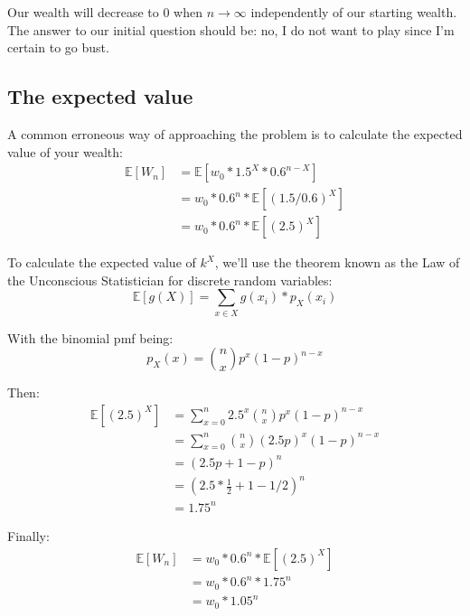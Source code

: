 \documentclass[12pt]{article}
\begin{document}
  
Our wealth will decrease to 0 when $n\to\infty$ independently of our starting wealth. The answer to our initial question should be: no, I do not want to play since I'm certain to go bust.

\subsection{The expected value}
A common erroneous way of approaching the problem is to calculate the expected value of your wealth:
\begin{equation*}
  \begin{split}
    \mathbb{E}[W_n] &= \mathbb{E}[w_0 * 1.5^X * 0.6^{n-X}]\\
    & = w_0 * 0.6^n * \mathbb{E}[(1.5/0.6)^X]\\
    & = w_0 * 0.6^n * \mathbb{E}[(2.5)^X]
  \end{split}
\end{equation*}

To calculate the expected value of $k^X$, we'll use the theorem known as the Law of the Unconscious Statistician for discrete random variables:
\begin{equation}
    \mathbb{E}[g(X)] = \sum\limits_{x \in X} g(x_i)*p_X(x_i)
\end{equation}

With the binomial pmf being:
\begin{equation}
    p_X(x) = {n \choose x} p^x (1-p)^{n-x}
\end{equation}

Then:
\begin{equation*}
  \begin{split}
    \mathbb{E}[(2.5)^X] &= \sum\limits_{x=0}^{n} 2.5^x {n \choose x} p^x (1-p)^{n-x}\\
    &= \sum\limits_{x=0}^{n} {n \choose x} (2.5p)^x (1-p)^{n-x}\\
    &= (2.5p + 1 - p)^n\\
    &= (2.5 * \frac{1}{2} + 1 - 1/2)^n\\
    & = 1.75^n
  \end{split}
\end{equation*}

Finally:
\begin{equation*}
  \begin{split}
    \mathbb{E}[W_n] &= w_0 * 0.6^n * \mathbb{E}[(2.5)^X]\\
    &= w_0 * 0.6^n * 1.75^n\\
    &= w_0 * 1.05^n
  \end{split}
\end{equation*}
\end{document}
